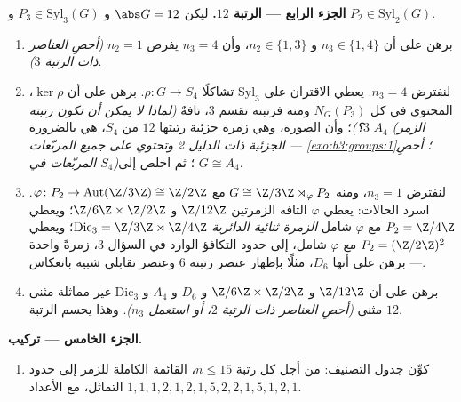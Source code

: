 \begin{problem}
\medskip
\noindent\textbf{الجزء الرابع --- الرتبة $12$.} ليكن
$\abs G = 12$ و $P_3
\in \mathrm{Syl}_3(G)$ و $P_2 \in \mathrm{Syl}_2(G)$.
\begin{enumerate}[resume]
  \item برهن على أن $n_3 \in \{1, 4\}$ و $n_2 \in \{1, 3\}$، وأن $n_3
        = 4$ يفرض $n_2 = 1$
        \emph{(أحصِ العناصر ذات الرتبة $3$)}.
  \item لنفترض $n_3 = 4$. يعطي  الاقتران على $\mathrm{Syl}_3$
        تشاكلًا $\rho \colon G \to S_4$. برهن على أن $\ker \rho$، المحتوى في كل
        $N_G(P_3)$ ومنه فرتبته تقسم $3$، تافهٌ \emph{(لماذا لا
        يمكن أن تكون رتبته $3$؟)}؛ وأن الصورة، وهي زمرة جزئية
        رتبتها $12$ من $S_4$، هي بالضرورة $A_4$ \emph{(الزمر
        الجزئية ذات الدليل 2  وتحتوي على جميع المربّعات ---
        \cref{exo:b3:groups:1}؛ أحصِ المربّعات في $S_4$)}؛ ثم اخلص إلى
        $G \cong A_4$.
  \item لنفترض $n_3 = 1$، ومنه $G \cong \Z/3\Z \rtimes_\varphi P_2$ مع $\varphi \colon P_2 \to \operatorname{Aut}(\Z/3\Z)
        \cong \Z/2\Z$. اسرد الحالات:
        يعطي $\varphi$ التافه الزمرتين $\Z/12\Z$ و $\Z/6\Z \times \Z/2\Z$؛
        ويعطي $P_2 =
        \Z/4\Z$ مع $\varphi$ شامل \emph{الزمرة ثنائية
        الدائرية} $\mathrm{Dic}_3 = \Z/3\Z \rtimes
        \Z/4\Z$؛ ويعطي $P_2 = (\Z/2\Z)^2$ مع $\varphi$ شامل، إلى
        حدود التكافؤ الوارد في السؤال 3، زمرةً واحدة --- برهن على
        أنها $D_6$، مثلًا بإظهار عنصر رتبته $6$ وعنصر تقابلي شبيه
        بانعكاس.
  \item برهن على أن $\Z/12\Z$ و $\Z/6\Z \times \Z/2\Z$ و $D_6$ و $A_4$ و
        $\mathrm{Dic}_3$ غير مماثلة مثنى مثنى \emph{(أحصِ العناصر
        ذات الرتبة $2$، أو استعمل $n_3$)}. وهذا يحسم الرتبة $12$.
\end{enumerate}

\medskip
\noindent\textbf{الجزء الخامس --- تركيب.}
\begin{enumerate}[resume]
  \item كوِّن جدول التصنيف: من أجل كل رتبة $n \leq
        15$، القائمة
        الكاملة للزمر إلى حدود التماثل، مع الأعداد $1, 1, 1, 2, 1, 2, 1, 5, 2, 2, 1, 5, 1, 2, 1$.
\end{enumerate}


\end{problem}
